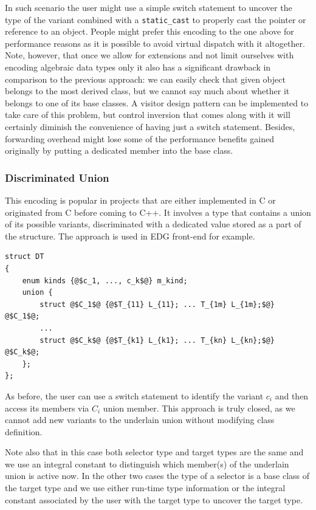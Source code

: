 \documentclass[preprint]{sigplanconf}
\makeatletter
\DeclareRobustCommand{\code}[1]{{\lstinline[breaklines=false,escapechar=@]{#1}}}
\makeatother
\begin{document}
In such scenario the user might use a simple switch statement to uncover the 
type of the variant combined with a \code{static_cast} to properly cast the 
pointer or reference to an object. People might prefer this encoding to the one 
above for performance reasons as it is possible to avoid virtual dispatch with 
it altogether. Note, however, that once we allow for extensions and not limit 
ourselves with encoding algebraic data types only it also has a significant 
drawback in comparison to the previous approach: we can easily check that given 
object belongs to the most derived class, but we cannot say much about whether 
it belongs to one of its base classes. A visitor design pattern can be 
implemented to take care of this problem, but control inversion that comes along 
with it will certainly diminish the convenience of having just a switch 
statement. Besides, forwarding overhead might lose some of the performance 
benefits gained originally by putting a dedicated member into the base class.

\subsubsection{Discriminated Union}
\label{sec:du}

This encoding is popular in projects that are either implemented in C or 
originated from C before coming to C++. It involves a type that contains a union 
of its possible variants, discriminated with a dedicated value stored as a part 
of the structure. The approach is used in EDG front-end\cite{EDG} for example.

\begin{lstlisting}[keepspaces,columns=flexible]
struct DT
{
    enum kinds {@$c_1, ..., c_k$@} m_kind;
    union {
        struct @$C_1$@ {@$T_{11} L_{11}; ... T_{1m} L_{1m};$@} @$C_1$@;
        ...
        struct @$C_k$@ {@$T_{k1} L_{k1}; ... T_{kn} L_{kn};$@} @$C_k$@; 
    };
};
\end{lstlisting}

As before, the user can use a switch statement to identify the variant $c_i$ and 
then access its members via $C_i$ union member. This approach is truly closed, as 
we cannot add new variants to the underlain union without modifying class 
definition. 

Note also that in this case both selector type and target types are the same and 
we use an integral constant to distinguish which member(s) of the underlain union 
is active now. In the other two cases the type of a selector is a base class of 
the target type and we use either run-time type information or the integral 
constant associated by the user with the target type to uncover the target type. 
\end{document}
